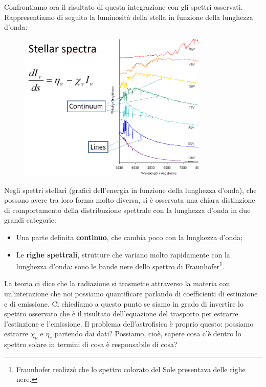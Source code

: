 \vspace{0.2cm}Confrontiamo ora il risultato di questa integrazione con gli spettri osservati. Rappresentiamo di seguito la luminosità della stella in funzione della lunghezza d'onda:

\begin{figure}[H]
    \centering
    \includegraphics[width=9cm]{28-10.20(spettri_stellari).png}
    \label{fig:spettri stellari}
\end{figure}

Negli spettri stellari (grafici dell'energia in funzione della lunghezza d'onda), che possono avere tra loro forma molto diversa, si è osservata una chiara distinzione di comportamento della distribuzione spettrale con la lunghezza d'onda in due grandi categorie:

\begin{itemize}
    \item Una parte definita \textbf{continuo}, che cambia poco con la lunghezza d'onda;
    \item Le \textbf{righe spettrali}, strutture che variano molto rapidamente con la lunghezza d'onda: sono le bande nere dello spettro di Fraunhofer\footnote{Fraunhofer realizzò che lo spettro colorato del Sole presentava delle righe nere.}.
\end{itemize}

La teoria ci dice che la radiazione si trasmette attraverso la materia con un'interazione che noi possiamo quantificare parlando di coefficienti di estinzione e di emissione. Ci chiediamo a questo punto se siamo in grado di invertire lo spettro osservato che è il risultato dell'equazione del trasporto per estrarre l'estinzione e l'emissione. Il problema dell'astrofisica è proprio questo: possiamo estrarre $\chi_\nu$ e $\eta_\nu$ partendo dai dati? Possiamo, cioè, sapere cosa c'è dentro lo spettro solare in termini di cosa è responsabile di cosa?

